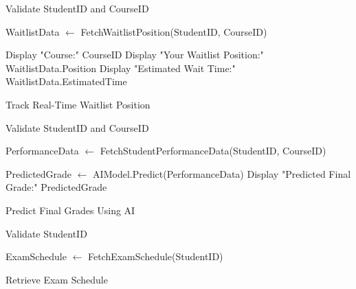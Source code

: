 \documentclass{article}
\begin{document}
\begin{algorithm}[H]
\SetAlgoLined
{}

Validate StudentID and CourseID\;

WaitlistData $\gets$ FetchWaitlistPosition(StudentID, CourseID)\;


Display "Course:" CourseID\;
Display "Your Waitlist Position:" WaitlistData.Position\;
Display "Estimated Wait Time:" WaitlistData.EstimatedTime\;

\caption{Track Real-Time Waitlist Position}
\end{algorithm}

\begin{algorithm}[H]
\SetAlgoLined
{}

Validate StudentID and CourseID\;

PerformanceData $\gets$ FetchStudentPerformanceData(StudentID, CourseID)\;

PredictedGrade $\gets$ AIModel.Predict(PerformanceData)\;
Display "Predicted Final Grade:" PredictedGrade\;

\caption{Predict Final Grades Using AI}
\end{algorithm}

\begin{algorithm}[H]
\SetAlgoLined
{}

Validate StudentID\;

ExamSchedule $\gets$ FetchExamSchedule(StudentID)\;



\caption{Retrieve Exam Schedule}
\end{algorithm}
\end{document}

